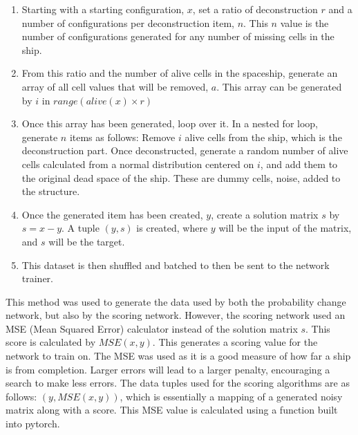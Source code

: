 \documentclass{l4proj}
\begin{document}
\begin{enumerate}
    \item Starting with a starting configuration, $x$, set a ratio of deconstruction $r$ and a number of configurations per deconstruction item, $n$. This $n$ value is the number of configurations generated for any number of missing cells in the ship.
    \item From this ratio and the number of alive cells in the spaceship, generate an array of all cell values that will be removed, $a$. This array can be generated by $i$ in $range(alive(x) \times r)$
    \item Once this array has been generated, loop over it. In a nested for loop, generate $n$ items as follows: Remove $i$ alive cells from the ship, which is the deconstruction part. Once deconstructed, generate a random number of alive cells calculated from a normal distribution centered on $i$, and add them to the original dead space of the ship. These are dummy cells, noise, added to the structure.
    \item Once the generated item has been created, $y$, create a solution matrix $s$ by $s = x - y$. A tuple $(y, s)$ is created, where $y$ will be the input of the matrix, and $s$ will be the target.
    \item This dataset is then shuffled and batched to then be sent to the network trainer.
\end{enumerate}

This method was used to generate the data used by both the probability change network, but also by the scoring network. However, the scoring network used an MSE (Mean Squared Error) calculator instead of the solution matrix $s$. This score is calculated by $MSE(x, y)$. This generates a scoring value for the network to train on. The MSE was used as it is a good measure of how far a ship is from completion. Larger errors will lead to a larger penalty, encouraging a search to make less errors. The data tuples used for the scoring algorithms are as follows: $(y, MSE(x, y))$, which is essentially a mapping of a generated noisy matrix along with a score. This MSE value is calculated using a function built into pytorch.
\end{document}
